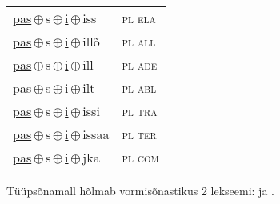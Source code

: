 \begin{minipage}{\textwidth}
\begin{sideways}
\begin{tabular}{l l}
\underline{pas}\,$\oplus$\,s\,$\oplus$\,\underline{i}\,$\oplus$\,iss & \textsc{ pl ela } \\
\underline{pas}\,$\oplus$\,s\,$\oplus$\,\underline{i}\,$\oplus$\,illõ & \textsc{ pl all } \\
\underline{pas}\,$\oplus$\,s\,$\oplus$\,\underline{i}\,$\oplus$\,ill & \textsc{ pl ade } \\
\underline{pas}\,$\oplus$\,s\,$\oplus$\,\underline{i}\,$\oplus$\,ilt & \textsc{ pl abl } \\
\underline{pas}\,$\oplus$\,s\,$\oplus$\,\underline{i}\,$\oplus$\,issi & \textsc{ pl tra } \\
\underline{pas}\,$\oplus$\,s\,$\oplus$\,\underline{i}\,$\oplus$\,issaa & \textsc{ pl ter } \\
\underline{pas}\,$\oplus$\,s\,$\oplus$\,\underline{i}\,$\oplus$\,jka & \textsc{ pl com } \\
\end{tabular}
\end{sideways}
\label{tab:tüüpsõnamall-passi}

\end{minipage}

 
\vspace{1em}
\noindent Tüüpsõnamall  hõlmab vormisõnastikus 2 lekseemi:  ja .
